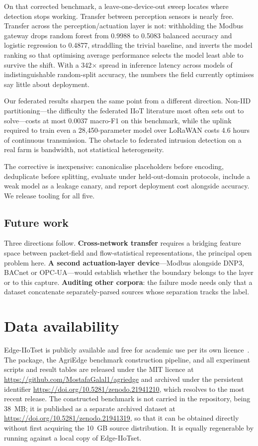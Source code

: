 On that corrected benchmark, a leave-one-device-out sweep locates where
detection stops working. Transfer between perception sensors is nearly free.
Transfer across the perception/actuation layer is not: withholding the Modbus
gateway drops random forest from 0.9988 to 0.5083 balanced accuracy and
logistic regression to 0.4877, straddling the trivial baseline, and inverts the
model ranking so that optimising average performance selects the model least
able to survive the shift. With a 342$\times$ spread in inference latency
across models of indistinguishable random-split accuracy, the numbers the field
currently optimises say little about deployment.

Our federated results sharpen the same point from a different direction.
Non-IID partitioning---the difficulty the federated IIoT literature most often
sets out to solve---costs at most 0.0037 macro-F1 on this benchmark, while the
uplink required to train even a 28{,}450-parameter model over LoRaWAN costs 4.6
hours of continuous transmission. The obstacle to federated intrusion detection
on a real farm is bandwidth, not statistical heterogeneity.

The corrective is inexpensive: canonicalise placeholders before encoding,
deduplicate before splitting, evaluate under held-out-domain protocols, include
a weak model as a leakage canary, and report deployment cost alongside
accuracy. We release tooling for all five.

\subsection{Future work}

Three directions follow. \textbf{Cross-network transfer} requires a bridging
feature space between packet-field and flow-statistical representations, the
principal open problem here. \textbf{A second actuation-layer device}---Modbus
alongside DNP3, BACnet or OPC-UA---would establish whether the boundary belongs
to the layer or to this capture. \textbf{Auditing other corpora}: the failure
mode needs only that a dataset concatenate separately-parsed sources whose
separation tracks the label.

\section*{Data availability}

Edge-IIoTset is publicly available and free for academic use per its own
licence~\cite{ferrag2022edgeiiotset}. The  package, the AgriEdge
benchmark construction pipeline, and all experiment scripts and result tables
are released under the MIT licence at
\url{https://github.com/MostafaGalal1/agriedge} and archived under the
persistent identifier \url{https://doi.org/10.5281/zenodo.21941210}, which
resolves to the most recent release. The constructed benchmark is not carried
in the repository, being 38~MB; it is published as a separate archived dataset
at \url{https://doi.org/10.5281/zenodo.21941319}, so that it can be obtained
directly without first acquiring the 10~GB source distribution. It is equally
regenerable by running  against a
local copy of Edge-IIoTset.

